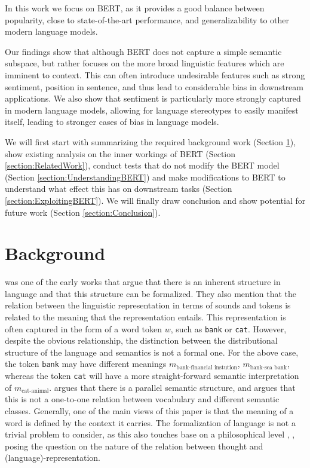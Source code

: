 \documentclass[a4paper,12pt,twoside,openright]{report}
\begin{document}
In this work we focus on BERT, as it provides a good balance between popularity, close to state-of-the-art performance, and generalizability to other modern language models.

Our findings show that although BERT does not capture a simple semantic subspace, but rather focuses on the more broad linguistic features which are imminent to context.
This can often introduce undesirable features such as strong sentiment, position in sentence, and thus lead to considerable bias in downstream applications.
We also show that sentiment is particularly more strongly captured in modern language models, allowing for language stereotypes to easily manifest itself, leading to stronger cases of bias in language models.

We will first start with summarizing the required background work (Section \ref{section:Background}), show existing analysis on the inner workings of BERT (Section \ref{section:RelatedWork}), conduct tests that do not modify the BERT model (Section \ref{section:UnderstandingBERT}) and make modifications to BERT to understand what effect this has on downstream tasks (Section \ref{section:ExploitingBERT}).
We will finally draw conclusion and show potential for future work (Section \ref{section:Conclusion}).


\chapter{Background}\label{section:Background} 

\cite{harris54} was one of the early works that argue that there is an inherent structure in language and that this structure can be formalized.
They also mention that the relation between the linguistic representation in terms of sounds and tokens is related to the meaning that the representation entails. 
This representation is often captured in the form of a word token $w$, such as \Verb#bank# or \Verb#cat#.
However, despite the obvious relationship, the distinction between the distributional structure of the language and semantics is not a formal one. 
For the above case, the token \Verb#bank# may have different meanings $m_\text{bank-financial instution}$, $m_\text{bank-sea bank}$, whereas the token \Verb#cat# will have a more straight-forward semantic interpretation of $m_\text{cat-animal}$.
\cite{harris54} argues that there is a parallel semantic structure, and argues that this is not a one-to-one relation between vocabulary and different semantic classes.
Generally, one of the main views of this paper is that the meaning of a word is defined by the context it carries.
The formalization of language is not a trivial problem to consider, as this also touches base on a philosophical level \cite{hegel17}, \cite{wittgenstein53}, posing the question on the nature of the relation between thought and (language)-representation.
\end{document}
